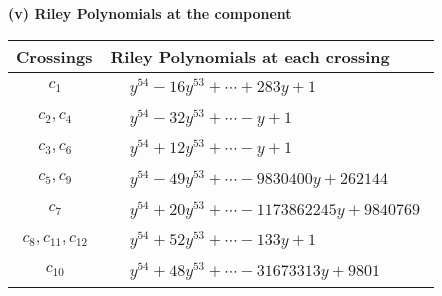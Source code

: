 \documentclass[1p]{elsarticle_modified}
\theoremstyle{definition}
\begin{document}
\newpage\renewcommand{\arraystretch}{1}
\flushleft \textbf{(v) Riley Polynomials at the component}\newline \\
\begin{tabular}{m{50pt}|m{274pt}}
Crossings & \hspace{64pt}Riley Polynomials at each crossing \\
\hline $$\begin{aligned}c_{1}\end{aligned}$$&$\begin{aligned}
&y^{54}-16 y^{53}+\cdots+283 y+1
\end{aligned}$\\
\hline $$\begin{aligned}c_{2},c_{4}\end{aligned}$$&$\begin{aligned}
&y^{54}-32 y^{53}+\cdots- y+1
\end{aligned}$\\
\hline $$\begin{aligned}c_{3},c_{6}\end{aligned}$$&$\begin{aligned}
&y^{54}+12 y^{53}+\cdots- y+1
\end{aligned}$\\
\hline $$\begin{aligned}c_{5},c_{9}\end{aligned}$$&$\begin{aligned}
&y^{54}-49 y^{53}+\cdots-9830400 y+262144
\end{aligned}$\\
\hline $$\begin{aligned}c_{7}\end{aligned}$$&$\begin{aligned}
&y^{54}+20 y^{53}+\cdots-1173862245 y+9840769
\end{aligned}$\\
\hline $$\begin{aligned}c_{8},c_{11},c_{12}\end{aligned}$$&$\begin{aligned}
&y^{54}+52 y^{53}+\cdots-133 y+1
\end{aligned}$\\
\hline $$\begin{aligned}c_{10}\end{aligned}$$&$\begin{aligned}
&y^{54}+48 y^{53}+\cdots-31673313 y+9801
\end{aligned}$\\
\hline
\end{tabular}\\~\\
\end{document}
